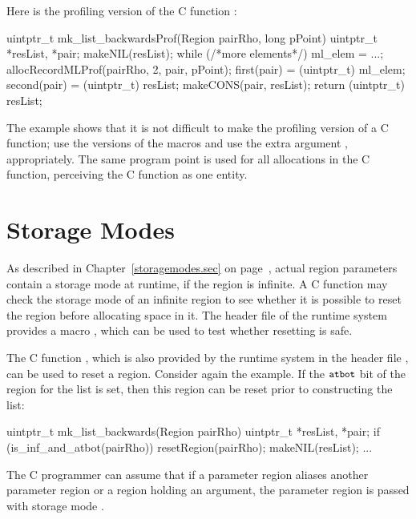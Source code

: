\documentclass[12pt]{book}
\begin{document}
Here is the profiling version of the C function :
\begin{scriptcode}
  uintptr_t
  mk_list_backwardsProf(Region pairRho, long pPoint) {
    uintptr_t *resList, *pair;
    makeNIL(resList);
    while (/*more elements*/) {
      ml_elem = ...;
      allocRecordMLProf(pairRho, 2, pair, pPoint);
      first(pair) = (uintptr_t) ml_elem;
      second(pair) = (uintptr_t) resList;
      makeCONS(pair, resList);
    }
    return (uintptr_t) resList;
  }
\end{scriptcode}
The example shows that it is not difficult to make the profiling version of a C
function; use the  versions of the macros and use the extra argument
, appropriately. The same program point is used for all allocations
in the C function, perceiving the C function as one entity.

\section{Storage Modes}
As described in Chapter~\ref{storagemodes.sec} on page~\pageref{atbit.lab},
actual region parameters contain a storage mode at runtime, if the region is
infinite.  A C function may check the storage mode of an infinite region to see
whether it is possible to reset the region before allocating space in it. The
header file  of the runtime system provides a macro
%
%
%
, which can be used to test whether resetting is safe.

The C function , which is also provided by the runtime system in
the header file , can be used to reset a
region. Consider again the  example. If the $\mbox{\small\ttfamily atbot}$ bit
of the region for the list is set, then this region can be reset prior to
constructing the list:
%
%
\begin{scriptcode}
  uintptr_t mk_list_backwards(Region pairRho) {
    uintptr_t *resList, *pair;
    if (is_inf_and_atbot(pairRho)) resetRegion(pairRho);
    makeNIL(resList);
    ...
  }
\end{scriptcode}
The C programmer can assume that if a parameter region aliases another parameter
region or a region holding an argument, the parameter region is passed with
storage mode .
\end{document}
